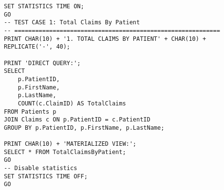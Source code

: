 
         \begin{lstlisting}
SET STATISTICS TIME ON;
GO
-- TEST CASE 1: Total Claims By Patient
-- ===========================================================
PRINT CHAR(10) + '1. TOTAL CLAIMS BY PATIENT' + CHAR(10) + REPLICATE('-', 40);

PRINT 'DIRECT QUERY:';
SELECT 
    p.PatientID,
    p.FirstName,
    p.LastName,
    COUNT(c.ClaimID) AS TotalClaims
FROM Patients p
JOIN Claims c ON p.PatientID = c.PatientID
GROUP BY p.PatientID, p.FirstName, p.LastName;

PRINT CHAR(10) + 'MATERIALIZED VIEW:';
SELECT * FROM TotalClaimsByPatient;
GO
-- Disable statistics
SET STATISTICS TIME OFF;
GO
        \end{lstlisting}